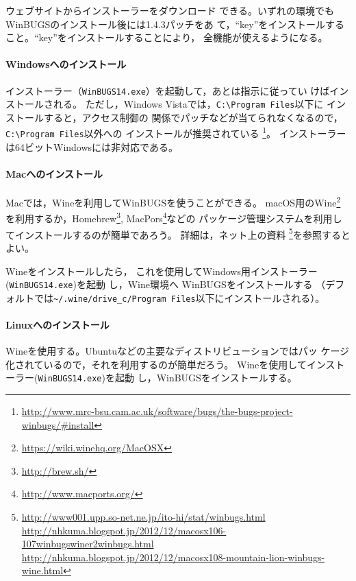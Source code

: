 \documentclass[11pt,uplatex]{jsarticle}
\begin{document}
ウェブサイトからインストーラーをダウンロード
できる。いずれの環境でも\textsf{WinBUGS}のインストール後には1.4.3パッチをあ
て，``key''をインストールすること。``key''をインストールすることにより，
全機能が使えるようになる。

\paragraph{Windowsへのインストール}

インストーラー（\texttt{WinBUGS14.exe}）を起動して，あとは指示に従ってい
けばインストールされる。
ただし，Windows Vistaでは，\texttt{C:{\textbackslash}Program~Files}以下に
インストールすると，アクセス制御の
関係でパッチなどが当てられなくなるので，\texttt{C:{\textbackslash}Program~Files}以外への
インストールが推奨されている
\footnote{\url{http://www.mrc-bsu.cam.ac.uk/software/bugs/the-bugs-project-winbugs/#install}}。
インストーラーは64ビットWindowsには非対応である。

\paragraph{Macへのインストール}

Macでは，\textsf{Wine}を利用して\textsf{WinBUGS}を使うことができる。
macOS用の\textsf{Wine}\footnote{\url{https://wiki.winehq.org/MacOSX}}
を利用するか，\textsf{Homebrew}\footnote{\url{http://brew.sh/}}, \textsf{MacPors}\footnote{\url{http://www.macports.org/}}などの
パッケージ管理システムを利用してインストールするのが簡単であろう。
詳細は，ネット上の資料
\footnote{\url{http://www001.upp.so-net.ne.jp/ito-hi/stat/winbugs.html}\\
\url{http://nhkuma.blogspot.jp/2012/12/macosx106-107winbugswiner2winbugs.html}\\
\url{http://nhkuma.blogspot.jp/2012/12/macosx108-mountain-lion-winbugs-wine.html}}を参照するとよい。


\textsf{Wine}をインストールしたら，
これを使用してWindows用インストーラー
(\texttt{WinBUGS14.exe})を起動
し，\textsf{Wine}環境へ
\textsf{WinBUGS}をインストールする
（デフォルトでは\texttt{\textasciitilde/.wine/drive\_c/Program Files}以下にインストールされる）。


\paragraph{Linuxへのインストール}
\textsf{Wine}を使用する。Ubuntuなどの主要なディストリビューションではパッ
ケージ化されているので，それを利用するのが簡単だろう。
\textsf{Wine}を使用してインストーラー(\texttt{WinBUGS14.exe})を起動
し，\textsf{WinBUGS}をインストールする。
\end{document}
